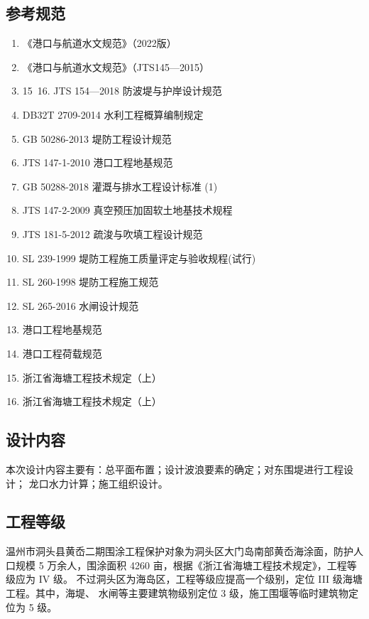 \documentclass[UTF8, a4paper, 12pt]{ctexart} %
\begin{document}
\subsection{参考规范}
\begin{enumerate}
    
    \item 《港口与航道水文规范》（2022版）
    \item 《港口与航道水文规范》（JTS145—2015）
    \item  15~16. JTS 154—2018 防波堤与护岸设计规范
    \item  DB32T 2709-2014 水利工程概算编制规定
    \item  GB 50286-2013  堤防工程设计规范
    \item JTS 147-1-2010 港口工程地基规范
    \item GB 50288-2018 灌溉与排水工程设计标准 (1)
    \item JTS 147-2-2009 真空预压加固软土地基技术规程
    \item JTS 181-5-2012 疏浚与吹填工程设计规范
    \item SL 239-1999 堤防工程施工质量评定与验收规程(试行)
    \item SL 260-1998 堤防工程施工规范
    \item SL 265-2016 水闸设计规范
    \item 港口工程地基规范
    \item 港口工程荷载规范
    \item 浙江省海塘工程技术规定（上）
    \item 浙江省海塘工程技术规定（上）
    
    \end{enumerate}

\subsection{设计内容}

本次设计内容主要有：总平面布置；设计波浪要素的确定；对东围堤进行工程设计；
龙口水力计算；施工组织设计。

\subsection{工程等级}
温州市洞头县黄岙二期围涂工程保护对象为洞头区大门岛南部黄岙海涂面，防护人口规模 5
万余人，围涂面积 4260 亩，根据《浙江省海塘工程技术规定》，工程等级应为 IV 级。
不过洞头区为海岛区，工程等级应提高一个级别，定位 III 级海塘工程。其中，海堤、
水闸等主要建筑物级别定位 3 级，施工围堰等临时建筑物定位为 5 级。
\end{document}

